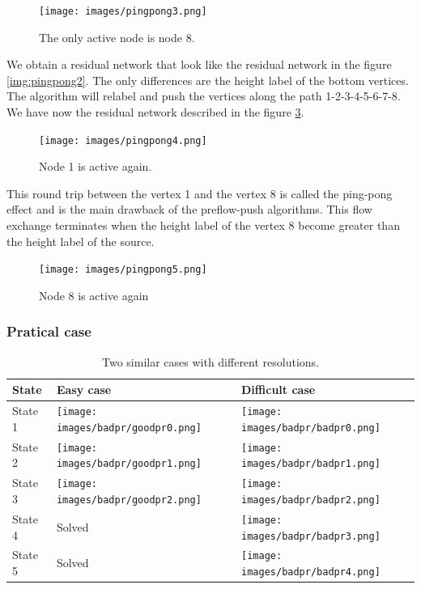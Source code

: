 \begin{figure}[H]
\centering
\texttt{[image: images/pingpong3.png]}
\caption{The only active node is node 8.}
\label{img:pingpong3}
\end{figure}

We obtain a residual network that look like the residual network in the figure \ref{img:pingpong2}. The only differences are the height label of the bottom vertices. The algorithm will relabel and push the vertices along the path 1-2-3-4-5-6-7-8. We have now the residual network described in the figure \ref{img:pingpong5}.
\begin{figure}[H]
\centering
\texttt{[image: images/pingpong4.png]}
\caption{Node 1 is active again.}
\label{img:pingpong4}
\end{figure}

This round trip between the vertex 1 and the vertex 8 is called the ping-pong effect and is the main drawback of the preflow-push algorithms. This flow exchange terminates when the height label of the vertex 8 become greater than the height label of the source.


\begin{figure}[H]
\centering
\texttt{[image: images/pingpong5.png]}
\caption{Node 8 is active again}
\label{img:pingpong5}
\end{figure}


\subsubsection{Pratical case}

\begin{table}
\begin{tabular}{|D|C|C|}
   \hline
   State & 
   Easy case & 
   Difficult case \\ \hline
   State 1 &
   \texttt{[image: images/badpr/goodpr0.png]} & 
   \texttt{[image: images/badpr/badpr0.png]} \\
   State 2 &
   \texttt{[image: images/badpr/goodpr1.png]} & 
   \texttt{[image: images/badpr/badpr1.png]} \\
   State 3 &
   \texttt{[image: images/badpr/goodpr2.png]} & 
   \texttt{[image: images/badpr/badpr2.png]} \\
   State 4 &
   Solved & 
   \texttt{[image: images/badpr/badpr3.png]} \\
   State 5 &
   Solved & 
   \texttt{[image: images/badpr/badpr4.png]} \\ 
   \hline
\end{tabular}
\caption{Two similar cases with different resolutions.}
\label{tabl:case}
\end{table}

